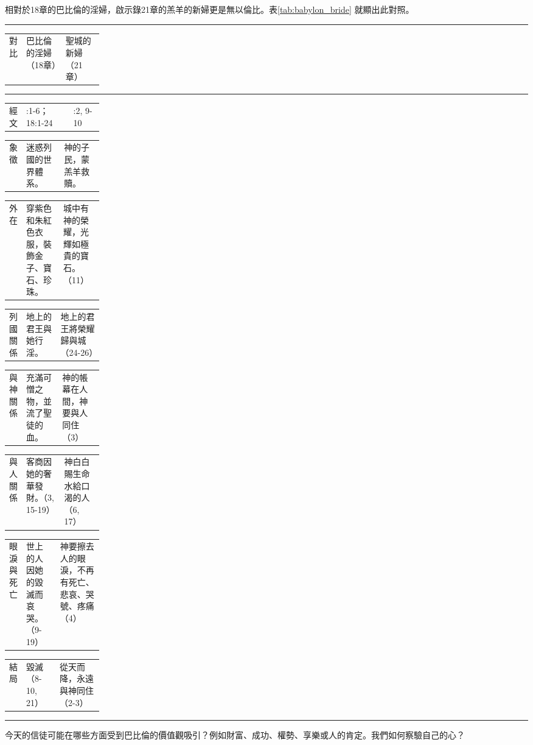 \begin{InDepth}

相對於18章的巴比倫的淫婦，啟示錄21章的羔羊的新婦更是無以倫比。表\ref{tab:babylon_bride} 就顯出此對照。

\par\medskip
{\small\renewcommand{\arraystretch}{1}\setlength{\tabcolsep}{4pt}%
\newcommand{\BBrow}[3]{%
  \par\nointerlineskip\noindent
  \begin{tabularx}{\linewidth}{>{\raggedright\arraybackslash}p{0.18\linewidth}
                                >{\raggedright\arraybackslash}X
                                >{\raggedright\arraybackslash}X}
  #1 & #2 & #3 \\[2pt]
  \end{tabularx}\par}%
\noindent\begin{minipage}{\linewidth}
\centering
{}
\label{tab:babylon_bride}
\noindent\rule{\linewidth}{0.4pt}%
\BBrow{對比}{巴比倫的淫婦（18章）}{聖城的新婦（21章）}
\noindent\rule{\linewidth}{0.4pt}%
\BBrow{經文}{17:1-6；18:1-24}{21:2, 9-10}
\end{minipage}
\BBrow{象徵}{迷惑列國的世界體系。}{神的子民，蒙羔羊救贖。}
\BBrow{外在}{穿紫色和朱紅色衣服，裝飾金子、寶石、珍珠。}{城中有神的榮耀，光輝如極貴的寶石。（11）}
\BBrow{列國關係}{地上的君王與她行淫。}{地上的君王將榮耀歸與城（24-26）}
\BBrow{與神關係}{充滿可憎之物，並流了聖徒的血。}{神的帳幕在人間，神要與人同住（3）}
\BBrow{與人關係}{客商因她的奢華發財。（3, 15-19）}{神白白賜生命水給口渴的人（6, 17）}
\BBrow{眼淚與死亡}{世上的人因她的毀滅而哀哭。（9-19）}{神要擦去人的眼淚，不再有死亡、悲哀、哭號、疼痛（4）}
\BBrow{結局}{毀滅（8-10, 21）}{從天而降，永遠與神同住（2-3）}
\noindent\rule{\linewidth}{0.4pt}%
}
\end{InDepth}

\begin{ReaderQuestion}
今天的信徒可能在哪些方面受到巴比倫的價值觀吸引？例如財富、成功、權勢、享樂或人的肯定。我們如何察驗自己的心？
\end{ReaderQuestion}
